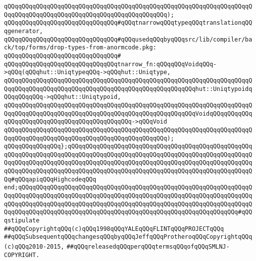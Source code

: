 \verb|qQQqqQQqqQQqqQQqqQQqqQQqqQQqqQQqqQQqqQQqqQQqqQQqqQQqqQQqqQQqqQQqqQQqqQQqqQQqqQQqqQQqqQQqqQQqqQQqqQQqqQQqqQQqqQQqqQQq);|\newline
\newline
\verb|qQQqqQQqqQQqqQQqqQQqqQQqqQQqqQQq#qQQqtnarrowqQQqtypeqQQqtranslationqQQqgenerator,|\newline
\verb|qQQqqQQqqQQqqQQqqQQqqQQqqQQqqQQq#qQQqusedqQQqbyqQQqsrc/lib/compiler/back/top/forms/drop-types-from-anormcode.pkg:|\newline
\verb|qQQqqQQqqQQqqQQqqQQqqQQqqQQqqQQq#|\newline
\verb|qQQqqQQqqQQqqQQqqQQqqQQqqQQqqQQqtnarrow_fn:qQQqqQQqVoidqQQq->qQQq(qQQqhut::UniqtypeqQQq->qQQqhut::Uniqtype,|\newline
\verb|qQQqqQQqqQQqqQQqqQQqqQQqqQQqqQQqqQQqqQQqqQQqqQQqqQQqqQQqqQQqqQQqqQQqqQQqqQQqqQQqqQQqqQQqqQQqqQQqqQQqqQQqqQQqqQQqqQQqqQQqqQQqhut::UniqtypoidqQQqqQQqqQQq->qQQqhut::Uniqtypoid,|\newline
\verb|qQQqqQQqqQQqqQQqqQQqqQQqqQQqqQQqqQQqqQQqqQQqqQQqqQQqqQQqqQQqqQQqqQQqqQQqqQQqqQQqqQQqqQQqqQQqqQQqqQQqqQQqqQQqqQQqqQQqqQQqqQQqVoidqQQqqQQqqQQqqQQqqQQqqQQqqQQqqQQqqQQqqQQqqQQqqQQq->qQQqVoid|\newline
\verb|qQQqqQQqqQQqqQQqqQQqqQQqqQQqqQQqqQQqqQQqqQQqqQQqqQQqqQQqqQQqqQQqqQQqqQQqqQQqqQQqqQQqqQQqqQQqqQQqqQQqqQQqqQQqqQQqqQQq);|\newline
\newline
\verb|qQQqqQQqqQQqqQQq};qQQqqQQqqQQqqQQqqQQqqQQqqQQqqQQqqQQqqQQqqQQqqQQqqQQqqQQqqQQqqQQqqQQqqQQqqQQqqQQqqQQqqQQqqQQqqQQqqQQqqQQqqQQqqQQqqQQqqQQqqQQqqQQqqQQqqQQqqQQqqQQqqQQqqQQqqQQqqQQqqQQqqQQqqQQqqQQqqQQqqQQqqQQqqQQqqQQqqQQqqQQqqQQqqQQqqQQqqQQqqQQqqQQqqQQqqQQqqQQqqQQqqQQqqQQqqQQqqQQqqQQq#qQQqapiqQQqHighcodeqQQq|\newline
\verb|end;qQQqqQQqqQQqqQQqqQQqqQQqqQQqqQQqqQQqqQQqqQQqqQQqqQQqqQQqqQQqqQQqqQQqqQQqqQQqqQQqqQQqqQQqqQQqqQQqqQQqqQQqqQQqqQQqqQQqqQQqqQQqqQQqqQQqqQQqqQQqqQQqqQQqqQQqqQQqqQQqqQQqqQQqqQQqqQQqqQQqqQQqqQQqqQQqqQQqqQQqqQQqqQQqqQQqqQQqqQQqqQQqqQQqqQQqqQQqqQQqqQQqqQQqqQQqqQQqqQQqqQQqqQQqqQQq#qQQqstipulate|\newline
\newline
\verb|##qQQqCopyrightqQQq(c)qQQq1998qQQqYALEqQQqFLINTqQQqPROJECTqQQq|\newline
\verb|##qQQqSubsequentqQQqchangesqQQqbyqQQqJeffqQQqProtheroqQQqCopyrightqQQq(c)qQQq2010-2015,|\newline
\verb|##qQQqreleasedqQQqperqQQqtermsqQQqofqQQqSMLNJ-COPYRIGHT.|\newline


